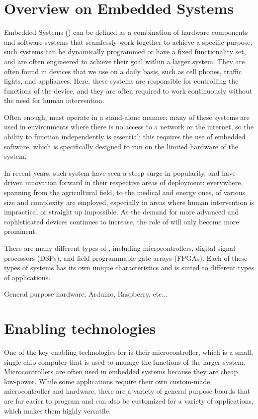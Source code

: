 \section{Overview on Embedded Systems}
Embedded Systems (\ess) can be defined as a combination of hardware components and software systems that seamlessly work together to achieve a specific purpose; such systems can be dynamically programmed or have a fixed functionality set, and are often engineered to achieve their goal within a larger system. They are often found in devices that we use on a daily basis, such as cell phones, traffic lights, and appliances. Here, these systems are responsible for controlling the functions of the device, and they are often required to work continuously without the need for human intervention.

Often enough, \ess must operate in a stand-alone manner: many of these systems are used in environments where there is no access to a network or the internet, so the ability to function independently is essential; this requires the use of embedded software, which is specifically designed to run on the limited hardware of the system.

In recent years, such system have seen a steep surge in popularity, and have driven innovation forward in their respective areas of deployment: everywhere, spanning from the agricultural field, to the medical and energy ones, \ess of various size and complexity are employed, especially in areas where human intervention is impractical or straight up impossible.
As the demand for more advanced and sophisticated devices continues to increase, the role of \ess will only become more prominent.

There are many different types of \ess, including microcontrollers, digital signal processors (DSPs), and field-programmable gate arrays (FPGAs). Each of these types of systems has its own unique characteristics and is suited to different types of applications.

General purpose hardware, Arduino, Raspberry, etc...



\section{Enabling technologies}
One of the key enabling technologies for \ess is their microcontroller, which is a small, single-chip computer that is used to manage the functions of the larger system. Microcontrollers are often used in embedded systems because they are cheap, low-power. While some applications require their own custom-made microcontroller and hardware, there are a variety of  general purpose boards that are far easier to program and can also be customized for a variety of applications, which makes them highly versatile.

